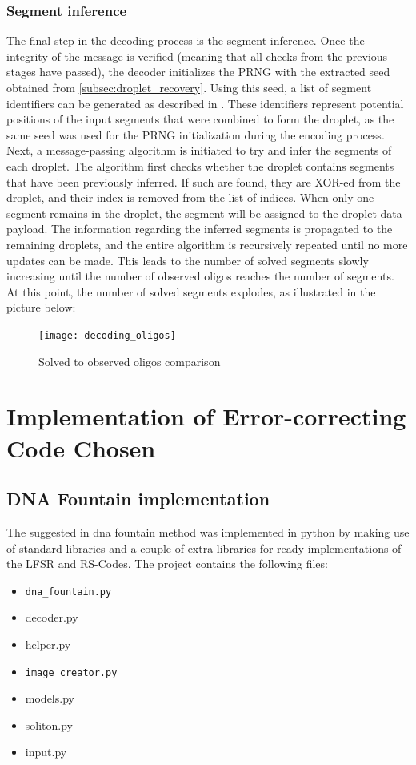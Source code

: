 \documentclass[12pt]%
{article}
\begin{document}
\subsubsection{Segment inference}

The final step in the decoding process is the segment inference. Once the integrity of the message is verified (meaning that all checks from the previous stages have passed), the decoder initializes the PRNG with the extracted seed obtained from \ref{subsec:droplet_recovery}. Using this seed, a list of segment identifiers can be generated as described in \cite{erlich2017dnasupplementary}. These identifiers represent potential positions of the input segments that were combined to form the droplet, as the same seed was used for the PRNG initialization during the encoding process. \\
Next, a message-passing algorithm is initiated to try and infer the segments of each droplet. The algorithm first checks whether the droplet contains segments that have been previously inferred. If such are found, they are XOR-ed from the droplet, and their index is removed from the list of indices. When only one segment remains in the droplet, the segment will be assigned to the droplet data payload. The information regarding the inferred segments is propagated to the remaining droplets, and the entire algorithm is recursively repeated until no more updates can be made. This leads to the number of solved segments slowly increasing until the number of observed oligos reaches the number of segments. At this point, the number of solved segments explodes, as illustrated in the picture below:

 \begin{figure}[h]
    \centering
    \texttt{[image: decoding\_oligos]}
    \caption{Solved to observed oligos comparison \cite{erlich2017dnasupplementary}}
\end{figure}


\section{Implementation of  Error-correcting Code Chosen}

\subsection{DNA Fountain implementation}

The suggested in \cite{erlich2017dna} dna fountain method was implemented in python by making use of standard libraries and a couple of extra libraries for ready implementations of the LFSR and RS-Codes. The project contains the following files:
\begin{itemize}
\item \texttt{dna\_fountain.py}
\item decoder.py
\item helper.py
\item \texttt{image\_creator.py}
\item models.py
\item soliton.py
\item input.py
\end{itemize}
\end{document}
